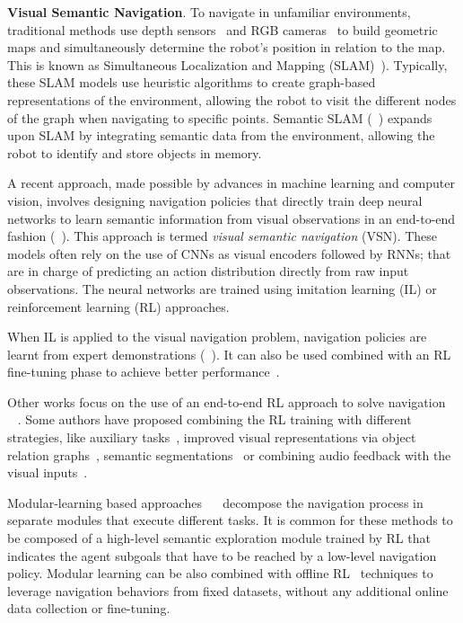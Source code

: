 \textbf{Visual Semantic Navigation}.
To navigate in unfamiliar environments, traditional methods use depth sensors~\cite{newcombe2011, thrun2001} and RGB cameras~\cite{jones2011, sattler2018} to build geometric maps and simultaneously determine the robot's position in relation to the map.
This is known as Simultaneous Localization and Mapping (SLAM)~\cite{Kazerouni2022, campos2021, labbe2022}).
Typically, these SLAM models use heuristic algorithms to create graph-based representations of the environment, allowing the robot to visit the different nodes of the graph when navigating to specific points.
Semantic SLAM (\eg~\cite{zhang2018, rosinol2020, jin2023}) expands upon SLAM by integrating semantic data from the environment, allowing the robot to identify and store objects in memory.

A recent approach, made possible by advances in machine learning and computer vision, involves designing navigation policies that directly train deep neural networks to learn semantic information from visual observations in an end-to-end fashion (\eg~\cite{ramrakhya2022,yadav2022, gutierrez2019, khandelwal2022, chaplot2020,chang2020}).
This approach is termed \textit{visual semantic navigation} (VSN).
These models often rely on the use of CNNs as visual encoders followed by RNNs; that are in charge of predicting an action distribution directly from raw input observations.
The neural networks are trained using imitation learning (IL) or reinforcement learning (RL) approaches.

When IL is applied to the visual navigation problem, navigation policies are learnt from expert demonstrations (\eg~\cite{ramrakhya2022,yadav2022}).
It can also be used combined with an RL fine-tuning phase to achieve better performance~\cite{ramrakhya2023}.

Other works focus on the use of an end-to-end RL approach to solve \objnav navigation~\cite{zhu2017, gutierrez2019, wijmans2020, khandelwal2022, Liu2022, Yadav2023OVRLV2AS} \hypersetup{citecolor=red}~\cite{Xu2024DeepRL, YokoyamaHM3DOVONAD} \hypersetup{citecolor=blue}.
Some authors have proposed combining the RL training with different strategies, like auxiliary tasks~\cite{ye2021}, improved visual representations via object relation graphs~\cite{yang2018}, semantic segmentations~\cite{Mousavian2018} or combining audio feedback with the visual inputs~\cite{Wang2023, Kondoh2023MultigoalAN}.

Modular-learning based approaches~\cite{chaplot2020, chang2020, skillfusion, Li2023RDDRLAR, zhou2022improving} \hypersetup{citecolor=red}~\cite{Cai2024DGMemLV, Kang2024HSPNavHS, Wang2023ProbableOL, Wasserman2023ExploitationGuidedEF, Yokoyama2023VLFMVF} \hypersetup{citecolor=blue} decompose the navigation process in separate modules that execute different tasks.
It is common for these methods to be composed of a high-level semantic exploration module trained by RL that indicates the agent subgoals that have to be reached by a low-level navigation policy.
Modular learning can be also combined with offline RL~\cite{shah2022} techniques to leverage navigation behaviors from fixed datasets, without any additional online data collection or fine-tuning.

